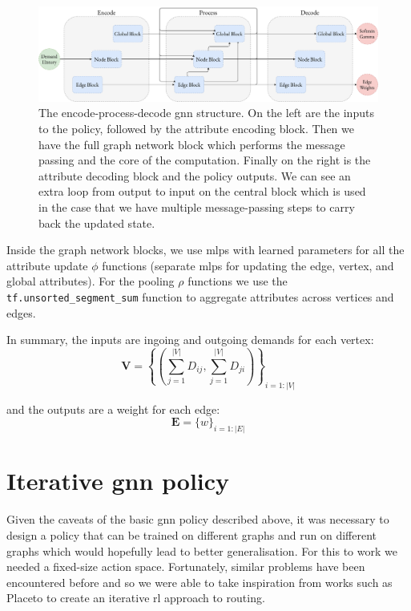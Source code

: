 \begin{figure}
    \centering
    \includegraphics[width=\textwidth]{figures/encode_process_decode.pdf}
    \caption{The encode-process-decode \ac{gnn} structure. On the left are the inputs to the policy, followed by the attribute encoding block. Then we have the full graph network block which performs the message passing and the core of the computation. Finally on the right is the attribute decoding block and the policy outputs. We can see an extra loop from output to input on the central block which is used in the case that we have multiple message-passing steps to carry back the updated state.}
    \label{fig:encode_process_decode}
\end{figure}

Inside the graph network blocks, we use \acp{mlp} with learned parameters for all the attribute update $\phi$ functions (separate \acp{mlp} for updating the edge, vertex, and global attributes). For the pooling $\rho$ functions we use the \texttt{tf.unsorted\_segment\_sum} function to aggregate attributes across vertices and edges.

In summary, the inputs are ingoing and outgoing demands for each vertex:
\begin{equation}
  \label{equation:node_inputs}
  \bm{V} = \left\{\left(\sum_{j=1}^{|V|}{D_{ij}}, \sum_{j=1}^{|V|}{D_{ji}}\right)\right\}_{i=1:|V|}
\end{equation}

and the outputs are a weight for each edge:
\begin{equation}
  \label{equation:edge_outputs}
  \bm{E} = \{w\}_{i=1:|E|}
\end{equation}


\section{Iterative \ac{gnn} policy}
\label{section:gnn_iterative}
Given the caveats of the basic \ac{gnn} policy described above, it was necessary to design a policy that can be trained on different graphs and run on different graphs which would hopefully lead to better generalisation. For this to work we needed a fixed-size action space. Fortunately, similar problems have been encountered before and so we were able to take inspiration from works such as Placeto\cite{venkatakrishnan2019learning} to create an iterative \ac{rl} approach to routing.

